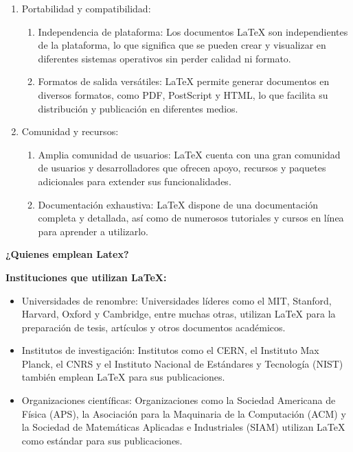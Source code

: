 \documentclass[10pt,twocolumn,a4paper]{article}
\begin{document}
\begin{enumerate}
\begin{enumerate}
    \end{enumerate}
	\item Portabilidad y compatibilidad:
	\begin{enumerate}
        \item Independencia de plataforma: Los documentos LaTeX son independientes de la plataforma, lo que significa que se pueden crear y visualizar en diferentes sistemas operativos sin perder calidad ni formato.
        \item Formatos de salida versátiles: LaTeX permite generar documentos en diversos formatos, como PDF, PostScript y HTML, lo que facilita su distribución y publicación en diferentes medios.   
    \end{enumerate}
    \item Comunidad y recursos:
    \begin{enumerate}
        \item Amplia comunidad de usuarios: LaTeX cuenta con una gran comunidad de usuarios y desarrolladores que ofrecen apoyo, recursos y paquetes adicionales para extender sus funcionalidades.
        \item Documentación exhaustiva: LaTeX dispone de una documentación completa y detallada, así como de numerosos tutoriales y cursos en línea para aprender a utilizarlo.  
    \end{enumerate}
\end{enumerate} 
 
{\raggedleft \textbf{¿Quienes emplean Latex?}}

{\raggedleft \textbf{Instituciones que utilizan LaTeX:}}

\begin{itemize}
	\item Universidades de renombre: Universidades líderes como el MIT, Stanford, Harvard, Oxford y Cambridge, entre muchas otras, utilizan LaTeX para la preparación de tesis, artículos y otros documentos académicos.
	\item Institutos de investigación: Institutos como el CERN, el Instituto Max Planck, el CNRS y el Instituto Nacional de Estándares y Tecnología (NIST) también emplean LaTeX para sus publicaciones.
	\item Organizaciones científicas: Organizaciones como la Sociedad Americana de Física (APS), la Asociación para la Maquinaria de la Computación (ACM) y la Sociedad de Matemáticas Aplicadas e Industriales (SIAM) utilizan LaTeX como estándar para sus publicaciones.
\end{itemize}
\end{document}
